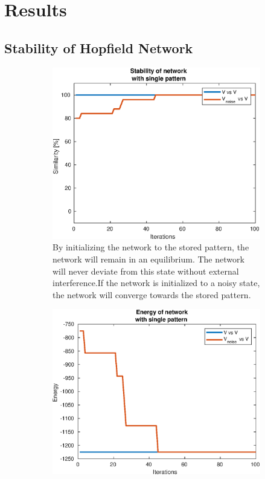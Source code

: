\section{Results}

\subsection{Stability of Hopfield Network}
\begin{figure}[H]
    \centering
    \begin{subfigure}{0.49\textwidth}
        \includegraphics[width=\textwidth]{figs/stable}
        \caption{By initializing the network to the stored pattern, the network will remain in an equilibrium. The network will never deviate from this state without external interference.If the network is initialized to a noisy state, the network will converge towards the stored pattern.}
    \end{subfigure}
    \begin{subfigure}{0.49\textwidth}
        \includegraphics[width=\textwidth]{figs/stable-energy}

\end{subfigure}
\end{figure}
